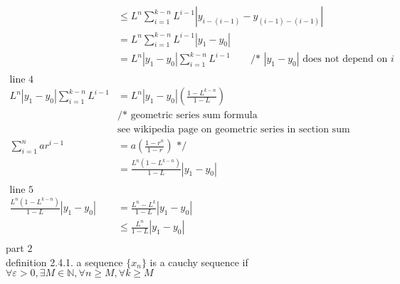 \documentclass[12pt, border = 4pt, multi]{article} %
\begin{document}
\begin{align*}
&\leq L ^ n \sum_{i = 1} ^ {k - n} L ^ {i - 1}\left|y_{i - (i - 1)} - y_{(i - 1) - (i - 1)}\right|\\
&= L ^ n \sum_{i = 1} ^ {k - n} L ^ {i - 1}|y_1 - y_0|\\
&= L ^ n |y_1 - y_0| \sum_{i = 1} ^ {k - n} L ^ {i - 1} \qquad \text{/* $|y_1 - y_0|$ does not depend on $i$}\\
\\
\text{line 4}\\
L ^ n |y_1 - y_0| \sum_{i = 1} ^ {k - n} L ^ {i - 1} &= L ^ n |y_1 - y_0|\left(\frac{1 - L ^ {k - n}}{1 - L}\right)\\
&\text{/* geometric series sum formula}\\
&\text{see wikipedia page on geometric series in section sum closed formula}\\
\sum_{i = 1} ^ n a r ^ {i - 1} &= a\left(\frac{1 - r ^ n}{1 - r}\right) \text{ */}\\
&= \frac{L ^ n(1 - L ^ {k - n})}{1 - L}|y_1 - y_0|\\
\\
\text{line 5}\\
\frac{L ^ n(1 - L ^ {k - n})}{1 - L}|y_1 - y_0| &= \frac{L ^ n - L ^ k}{1 - L}|y_1 - y_0|\\
&\leq \frac{L ^ n}{1 - L}|y_1 - y_0|\\
\end{align*}
part 2\\
definition 2.4.1. a sequence $\{x_n\}$ is a cauchy sequence if $\forall \varepsilon > 0, \exists M \in \mathbb{N}, \forall n \geq M, \forall k \geq M$
\end{document}
